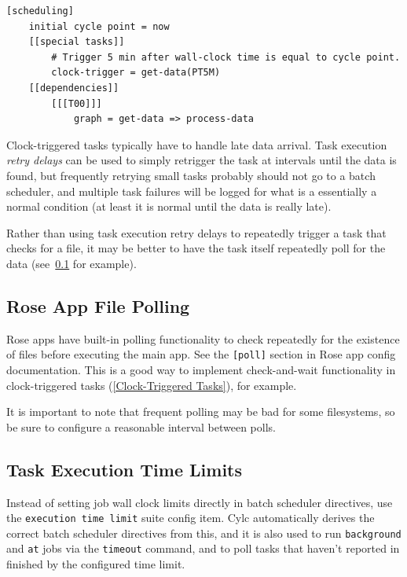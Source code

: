\lstset{language=suiterc}
\begin{lstlisting}
[scheduling]
    initial cycle point = now
    [[special tasks]]
        # Trigger 5 min after wall-clock time is equal to cycle point.
        clock-trigger = get-data(PT5M)
    [[dependencies]]
        [[[T00]]]
            graph = get-data => process-data
\end{lstlisting}

Clock-triggered tasks typically have to handle late data arrival. Task
execution {\em retry delays} can be used to simply retrigger the task at
intervals until the data is found, but frequently retrying small tasks probably
should not go to a batch scheduler, and multiple task failures will be logged
for what is a essentially a normal condition (at least it is normal until the
data is really late).

Rather than using task execution retry delays to repeatedly trigger a task that
checks for a file, it may be better to have the task itself repeatedly poll for
the data (see~\ref{Rose App File Polling} for example).

\subsection{Rose App File Polling}
\label{Rose App File Polling}

Rose apps have built-in polling functionality to check repeatedly for the
existence of files before executing the main app. See the \lstinline=[poll]=
section in Rose app config documentation. This is a good way to implement
check-and-wait functionality in clock-triggered tasks (\ref{Clock-Triggered
Tasks}), for example.

It is important to note that frequent polling may be bad for some filesystems,
so be sure to configure a reasonable interval between polls. 

\subsection{Task Execution Time Limits}

Instead of setting job wall clock limits directly in batch scheduler
directives, use the \lstinline=execution time limit= suite config item.
Cylc automatically derives the correct batch scheduler directives from this,
and it is also used to run \lstinline=background= and \lstinline=at= jobs via
the \lstinline=timeout= command, and to poll tasks that haven't reported in
finished by the configured time limit.

